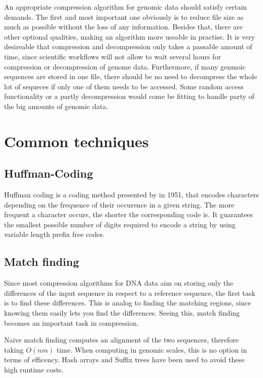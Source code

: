 \documentclass[acmtocl,acmnow]{article}
\begin{document}
An appropriate compression algorithm for genomic data should satisfy certain demands.
The first and most important one obviously is to reduce file size as much as possible without the loss of any information.
Besides that, there are other optional qualities, making an algorithm more useable in practise. It is very desireable
that compression and decompression only takes a passable amount of time, since scientific workflows will not allow to wait
several hours for compression or decompression of genome data.
Furthermore, if many genmoic sequences are stored in one file, there should be no need to decompress the whole lot of 
sequeces if only one of them needs to be accessed. Some random access functionality or a partly decompression would come
be fitting to handle party of the big amounts of genomic data.

\section{Common techniques}

\subsection{Huffman-Coding}

\label{huff}
Huffman coding is a coding method presented by \cite{huff} in 1951, that encodes characters depending on the frequence 
of their occurence in a given string. The more frequent a character occurs, the shorter the corresponding code is.
It guarantees the smallest possible number of digits required to encode a string by
using variable length prefix free codes.

\subsection{Match finding}
\label{hash}

Since most compression algorithms for DNA data aim on storing only the differences of the input sequence in respect to a
reference sequence, the first task is to find these differences. This is analog to finding the matching
regions, since knowing them easily lets you find the differences. Seeing this, match finding becomes an important task in
compression.

Naive match finding computes an alignment of the two sequences, therefore taking $O(nm)$ time. When computing in genomic
scales, this is no option in terms of efficency. Hash arrays and Suffix trees have been used to avoid these high runtime
costs.
\end{document}
